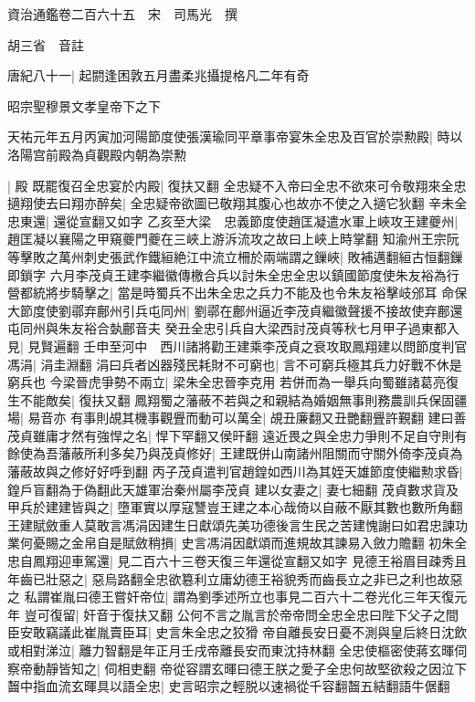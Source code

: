 資治通鑑卷二百六十五　宋　司馬光　撰

胡三省　音註

唐紀八十一|{
	起閼逢困敦五月盡柔兆攝提格凡二年有奇}


昭宗聖穆景文孝皇帝下之下

天祐元年五月丙寅加河陽節度使張漢瑜同平章事帝宴朱全忠及百官於崇勲殿|{
	時以洛陽宫前殿為貞觀殿内朝為崇勲}


|{
	殿}
既罷復召全忠宴於内殿|{
	復扶又翻}
全忠疑不入帝曰全忠不欲來可令敬翔來全忠擿翔使去曰翔亦醉矣|{
	全忠疑帝欲圖已敬翔其腹心也故亦不使之入擿它狄翻}
辛未全忠東還|{
	還從宣翻又如字}
乙亥至大梁　忠義節度使趙匡凝遣水軍上峽攻王建夔州|{
	趙匡凝以襄陽之甲窺夔門夔在三峽上游泝流攻之故曰上峽上時掌翻}
知渝州王宗阮等擊敗之萬州刺史張武作鐵絙絶江中流立柵於兩端謂之鏁峽|{
	敗補邁翻絙古恒翻鏁即鎖字}
六月李茂貞王建李繼徽傳檄合兵以討朱全忠全忠以鎮國節度使朱友裕為行營都統將步騎擊之|{
	當是時蜀兵不出朱全忠之兵力不能及也令朱友裕擊岐邠耳}
命保大節度使劉鄩弃鄜州引兵屯同州|{
	劉鄩在鄜州逼近李茂貞繼徽聲援不接故使弃鄜還屯同州與朱友裕合埶鄜音夫}
癸丑全忠引兵自大梁西討茂貞等秋七月甲子過東都入見|{
	見賢遍翻}
壬申至河中　西川諸將勸王建乘李茂貞之衰攻取鳳翔建以問節度判官馮涓|{
	涓圭淵翻}
涓曰兵者凶器殘民耗財不可窮也|{
	言不可窮兵極其兵力好戰不休是窮兵也}
今梁晉虎爭勢不兩立|{
	梁朱全忠晉李克用}
若併而為一舉兵向蜀雖諸葛亮復生不能敵矣|{
	復扶又翻}
鳳翔蜀之藩蔽不若與之和親結為婚姻無事則務農訓兵保固疆場|{
	易音亦}
有事則覘其機事觀舋而動可以萬全|{
	覘丑廉翻又丑艷翻舋許覲翻}
建曰善茂貞雖庸才然有強悍之名|{
	悍下罕翻又侯旰翻}
遠近畏之與全忠力爭則不足自守則有餘使為吾藩蔽所利多矣乃與茂貞修好|{
	王建既併山南諸州阻關而守關外倚李茂貞為藩蔽故與之修好好呼到翻}
丙子茂貞遣判官趙鍠如西川為其姪天雄節度使繼勲求昏|{
	鍠戶盲翻為于偽翻此天雄軍治秦州屬李茂貞}
建以女妻之|{
	妻七細翻}
茂貞數求貨及甲兵於建建皆與之|{
	墮軍實以厚寇讐豈王建之本心哉倚以自蔽不厭其數也數所角翻}
王建賦斂重人莫敢言馮涓因建生日獻頌先美功德後言生民之苦建愧謝曰如君忠諫功業何憂賜之金帛自是賦斂稍損|{
	史言馮涓因獻頌而進規故其諫易入斂力贍翻}
初朱全忠自鳳翔迎車駕還|{
	見二百六十三卷天復三年還從宣翻又如字}
見德王裕眉目疎秀且年齒已壯惡之|{
	惡烏路翻全忠欲簒利立庸幼德王裕貌秀而齒長立之非已之利也故惡之}
私謂崔胤曰德王嘗奸帝位|{
	謂為劉季述所立也事見二百六十二卷光化三年天復元年}
豈可復留|{
	奸音于復扶又翻}
公何不言之胤言於帝帝問全忠全忠曰陛下父子之間臣安敢竊議此崔胤賣臣耳|{
	史言朱全忠之狡猾}
帝自離長安日憂不測與皇后終日沈飲或相對涕泣|{
	離力智翻是年正月壬戌帝離長安而東沈持林翻}
全忠使樞密使蔣玄暉伺察帝動靜皆知之|{
	伺相吏翻}
帝從容謂玄暉曰德王朕之愛子全忠何故堅欲殺之因泣下齧中指血流玄暉具以語全忠|{
	史言昭宗之輕脱以速禍從千容翻齧五結翻語牛倨翻}
